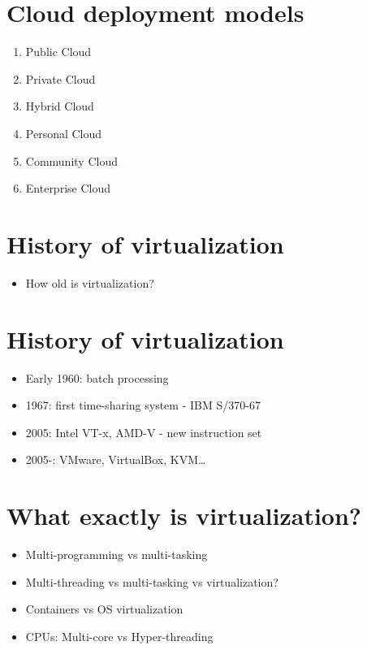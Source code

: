 \documentclass[11pt]{article}
\begin{document}
\section*{Cloud deployment models}
\label{sec:org4e223e2}
\begin{enumerate}
\item Public Cloud
\item Private Cloud
\item Hybrid Cloud
\item Personal Cloud
\item Community Cloud
\item Enterprise Cloud
\end{enumerate}

\section*{History of virtualization}
\label{sec:orgb36919a}
\begin{itemize}
\item How old is virtualization?
\end{itemize}

\section*{History of virtualization}
\label{sec:org87511df}
\begin{itemize}
\item Early 1960: batch processing
\item 1967: first time-sharing system - IBM S/370-67
\item 2005: Intel VT-x, AMD-V - new instruction set
\item 2005-: VMware, VirtualBox, KVM\ldots{}
\end{itemize}

\section*{What exactly is virtualization?}
\label{sec:org56a585e}
\begin{itemize}
\item Multi-programming vs multi-tasking
\item Multi-threading vs multi-tasking vs virtualization?
\item Containers vs OS virtualization
\item CPUs: Multi-core vs Hyper-threading
\end{itemize}
\end{document}
